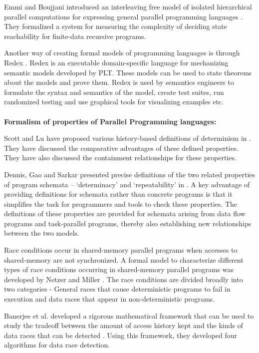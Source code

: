 Emmi and Boujjani introduced an interleaving free model of isolated hierarchical parallel computations for expressing general parallel programming languages \cite{bouajjani2012analysis}. They formalized a system for measuring the complexity of deciding state reachability for finite-data recursive programs.

Another way of creating formal models of programming languages is through Redex \cite{klein2012run}. Redex is an executable domain-specific language for mechanizing semantic models developed by PLT. These models can be used to state theorems about the models and prove them. Redex is used by semantics engineers to formulate the syntax and semantics of the model, create test suites, run randomized testing and use graphical tools for visualizing examples etc.\\
\\
\textbf{Formalism of properties of Parallel Programming languages:}

Scott and Lu have proposed various history-based definitions of determinism in \cite{lu2011toward}. They have discussed the comparative advantages of these defined properties. They have also discussed the containment relationships for these properties.

Dennis, Gao and Sarkar presented precise definitions of the two related properties of program schemata – ‘determinacy’ and ‘repeatability’ in \cite{dennis2012determinacy}. A key advantage of providing definitions for schemata rather than concrete programs is that it simplifies the task for programmers and tools to check these properties. The definitions of these properties are provided for schemata arising from data flow programs and task-parallel programs, thereby also establishing new relationships between the two models.

Race conditions occur in shared-memory parallel programs when accesses to shared-memory are not synchronized. A formal model to characterize different types of race conditions occurring in shared-memory parallel programs was developed by Netzer and Miller \cite{netzer1992race}. The race conditions are divided broadly into two categories - General races that cause deterministic programs to fail in execution and data races that appear in non-deterministic programs.

Banerjee et al. developed a rigorous mathematical framework that can be used to study the tradeoff between the amount of access history kept and the kinds of data races that can be detected \cite{banerjee2006theory}. Using this framework, they developed four algorithms for data race detection. 

